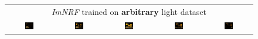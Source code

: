 \begin{figure}[!htb]
\begin{tabular*}{\textwidth}{ c c c c c }
        \multicolumn{5}{c}{\textit{ImNRF} trained on \textbf{arbitrary} light dataset} \\
          \includegraphics[width=0.2\textwidth]{figures/results/arb_set/dynamic_light/imnf_rand_vc0_ld-90.png}
        & \includegraphics[width=0.2\textwidth]{figures/results/arb_set/dynamic_light/imnf_rand_vc0_ld-60.png}
        & \includegraphics[width=0.2\textwidth]{figures/results/arb_set/dynamic_light/imnf_rand_vc0_ld0.png}
        & \includegraphics[width=0.2\textwidth]{figures/results/arb_set/dynamic_light/imnf_rand_vc0_ld60.png} 
        & \includegraphics[width=0.2\textwidth]{figures/results/arb_set/dynamic_light/imnf_rand_vc0_ld90.png} \\
        

\end{tabular*}
\end{figure}
